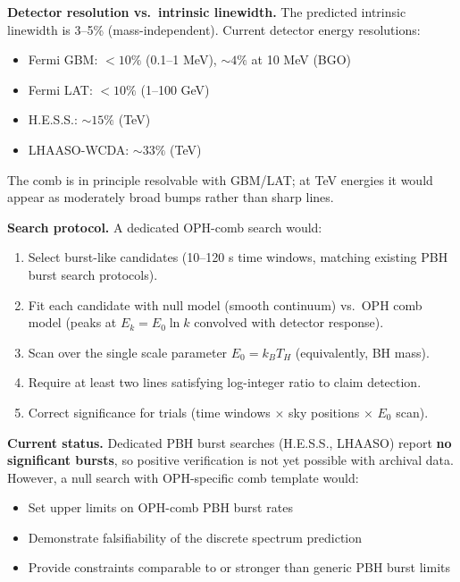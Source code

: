 \documentclass[11pt,a4paper]{article}
\theoremstyle{remark}
\providecommand{\tightlist}{%
  \setlength{\itemsep}{0pt}\setlength{\parskip}{0pt}}
\begin{document}
\textbf{Detector resolution vs.~intrinsic linewidth.} The predicted intrinsic
linewidth is 3--5\% (mass-independent). Current detector energy resolutions:

\begin{itemize}
\tightlist
\item
  Fermi GBM: \(< 10\%\) (0.1--1 MeV), \(\sim 4\%\) at 10 MeV (BGO)
\item
  Fermi LAT: \(< 10\%\) (1--100 GeV)
\item
  H.E.S.S.: \(\sim 15\%\) (TeV)
\item
  LHAASO-WCDA: \(\sim 33\%\) (TeV)
\end{itemize}

The comb is in principle resolvable with GBM/LAT; at TeV energies it would
appear as moderately broad bumps rather than sharp lines.

\textbf{Search protocol.} A dedicated OPH-comb search would:

\begin{enumerate}
\def\labelenumi{\arabic{enumi}.}
\tightlist
\item
  Select burst-like candidates (10--120 s time windows, matching existing
  PBH burst search protocols).
\item
  Fit each candidate with null model (smooth continuum) vs.~OPH comb model
  (peaks at \(E_k = E_0 \ln k\) convolved with detector response).
\item
  Scan over the single scale parameter \(E_0 = k_B T_H\) (equivalently, BH mass).
\item
  Require at least two lines satisfying log-integer ratio to claim detection.
\item
  Correct significance for trials (time windows \(\times\) sky positions \(\times\)
  \(E_0\) scan).
\end{enumerate}

\textbf{Current status.} Dedicated PBH burst searches (H.E.S.S., LHAASO) report
\textbf{no significant bursts}, so positive verification is not yet possible with
archival data. However, a null search with OPH-specific comb template would:

\begin{itemize}
\tightlist
\item
  Set upper limits on OPH-comb PBH burst rates
\item
  Demonstrate falsifiability of the discrete spectrum prediction
\item
  Provide constraints comparable to or stronger than generic PBH burst limits
\end{itemize}
\end{document}
